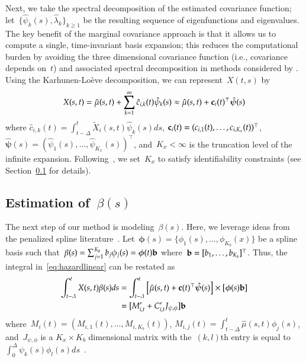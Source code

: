 \documentclass[11pt]{amsart}
\begin{document}
Next, we take the spectral decomposition of the estimated covariance
function; let~$\{ \hat \psi_k (s),\hat \lambda_k \}_{k \geq 1}$ be the
resulting sequence of eigenfunctions and eigenvalues. 
The key benefit of the marginal covariance approach is that it allows
us to compute a single, time-invariant basis expansion; this reduces
the computational burden by avoiding the three dimensional covariance
function (i.e., covariance depends on~$t$) and associated spectral
decomposition in methods considered by \cite{ChenMuller2012}.
Using the Karhunen-Lo{\`e}ve decomposition, we can represent~$X(t,s)$
by
\[
X(s,t) = \hat \mu(s,t) + \sum_{k=1}^{\infty} \hat c_{i,k} (t) \hat
\psi_k (s) \approx \hat \mu(s,t) + {\bf c}_{i} (t)^\top \mathbold{\hat
  \psi} (s)
\]
where $\hat c_{i,k} (t) = \int_{t-\Delta}^t \tilde X_i (s,t) \hat
\psi_k (s) ds$, ${\bf c}_i (t) = (c_{i,1} (t), \ldots, c_{i,K_x}
(t))^\top$, $\mathbold{\hat \psi} (s) = (\hat \psi_1 (s), \ldots, \hat
\psi_{K_x} (s))^\top$, and~$K_x < \infty$ is the truncation level of
the infinite expansion. Following~\cite{Goldsmith2011}, we set~$K_x$
to satisfy identifiability constraints (see Section~\ref{section:beta}
for details).  


\subsection{Estimation of~$\beta(s)$}
\label{section:beta}

The next step of our method is modeling~$\beta(s)$. Here, we leverage
ideas from the penalized spline literature~\citep{Ruppert2003,
  Wood2006book}. Let~$\mathbold{\phi} (s) = \{ \phi_1 (s), \ldots,
\phi_{K_b} (x) \}$ be a spline basis such that~$\beta(s) =
\sum_{j=1}^{K_b} b_j \phi_{j} (s) = \mathbold{\phi} (t) {\bf b}$
where~${\bf b} = [b_1, \ldots, b_{K_b}]^{\top}$. Thus, the integral
in~\eqref{eq:hazardlinear} can be restated as 
\begin{align*}
\int_{t-\Delta}^t X(s,t) \beta(s) ds 
  &= \int_{t-\Delta}^t \left[ \hat \mu(s,t) + {\bf c} (t)^\top
    \mathbold{\hat \psi} (s) \right] \times \left[
    \mathbold{\phi} (s) {\bf b} \right] \\
  &= [ M_{i,t}^\prime + C_{i,t}^\prime J_{\psi, \phi} ] {\bf b}
\end{align*}
where~$M_{i} (t) = (M_{i,1} (t), \ldots, M_{i,K_b} (t))$, $M_{i,j} (t)
= \int_{t-\Delta}^t \hat \mu (s,t) \phi_j (s)$, and~$J_{\psi, \phi}$ is a
$K_x \times K_b$ dimensional matrix with the~$(k,l)$th entry is equal
to~$\int_{0}^\Delta \psi_k (s) \phi_l (s)
ds$~\citep{RamsaySilverman2005}.
\end{document}
